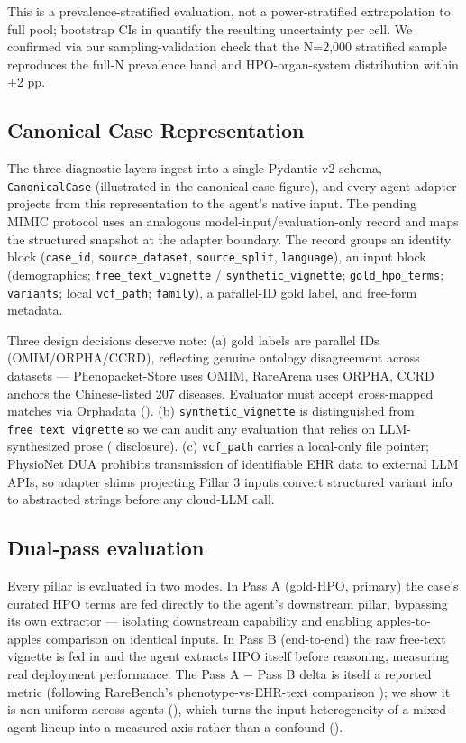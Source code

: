 This is a prevalence-stratified evaluation, not a power-stratified extrapolation to full pool; bootstrap CIs in  quantify the resulting uncertainty per cell.
We confirmed via our sampling-validation check that the N=2,000 stratified sample reproduces the full-N
prevalence band and HPO-organ-system distribution within \ensuremath{\pm}2 pp.

\subsection{Canonical Case Representation}\label{sec-4-3}

The three diagnostic layers ingest into a single Pydantic v2 schema,
\texttt{CanonicalCase} (illustrated in the canonical-case figure), and every agent
adapter projects from this representation to the agent's native input. The
pending MIMIC protocol uses an analogous model-input/evaluation-only record and
maps the structured snapshot at the adapter boundary. The record groups an
identity block (\texttt{case\_id}, \texttt{source\_dataset}, \texttt{source\_split}, \texttt{language}), an
input block (demographics; \texttt{free\_text\_vignette} / \texttt{synthetic\_vignette};
\texttt{gold\_hpo\_terms}; \texttt{variants}; local \texttt{vcf\_path}; \texttt{family}), a parallel-ID gold
label, and free-form metadata.

Three design decisions deserve note: (a) gold labels are parallel IDs (OMIM/ORPHA/CCRD), reflecting genuine ontology disagreement across datasets --- Phenopacket-Store uses OMIM, RareArena uses ORPHA, CCRD anchors the Chinese-listed 207 diseases. Evaluator must accept cross-mapped matches via Orphadata (). (b) \texttt{synthetic\_vignette} is distinguished from \texttt{free\_text\_vignette} so we can audit any evaluation that relies on LLM-synthesized prose ( disclosure). (c) \texttt{vcf\_path} carries a local-only file pointer; PhysioNet DUA prohibits transmission of identifiable EHR data to external LLM APIs, so adapter shims projecting Pillar 3 inputs convert structured variant info to abstracted strings before any cloud-LLM call.

\subsection{Dual-pass evaluation}\label{sec-4-4}

Every pillar is evaluated in two modes. In Pass A (gold-HPO, primary) the
case's curated HPO terms are fed directly to the agent's downstream pillar,
bypassing its own extractor --- isolating downstream capability and enabling
apples-to-apples comparison on identical inputs. In Pass B (end-to-end) the
raw free-text vignette is fed in and the agent extracts HPO itself before
reasoning, measuring real deployment performance. The Pass A \ensuremath{-} Pass B delta
is itself a reported metric (following RareBench's phenotype-vs-EHR-text
comparison \citep{rarebench2024}); we show it is non-uniform across agents
(), which turns the input heterogeneity of a mixed-agent lineup into a
measured axis rather than a confound ().

